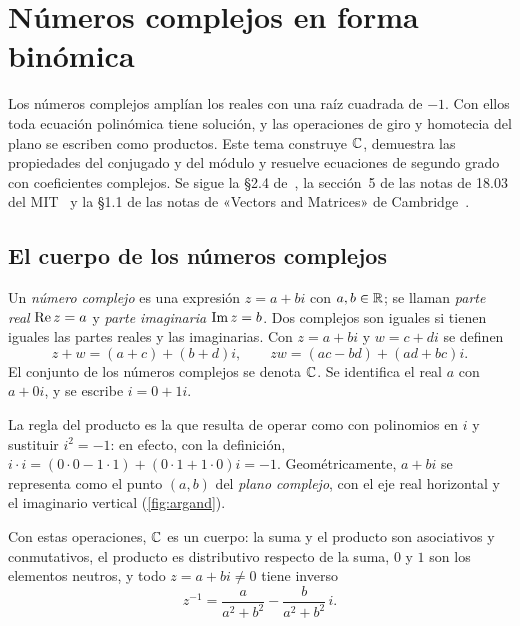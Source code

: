 \chapter{Números complejos en forma binómica}
\label{tema:5}

Los números complejos amplían los reales con una raíz cuadrada de $-1$. Con ellos toda ecuación polinómica tiene solución, y las operaciones de giro y homotecia del plano se escriben como productos. Este tema construye $\mathbb{C}$, demuestra las propiedades del conjugado y del módulo y resuelve ecuaciones de segundo grado con coeficientes complejos. Se sigue la §2.4 de~\cite{osat}, la sección~5 de las notas de 18.03 del MIT~\cite{mit1803} y la §1.1 de las notas de «Vectors and Matrices» de Cambridge~\cite{cambvm}.

\section{El cuerpo de los números complejos}

\begin{definicion}\label{def:complejos}
Un \emph{número complejo} es una expresión $z=a+bi$ con $a,b\in\mathbb{R}$; se llaman \emph{parte real} $\operatorname{Re} z=a$ y \emph{parte imaginaria} $\operatorname{Im} z=b$. Dos complejos son iguales si tienen iguales las partes reales y las imaginarias. Con $z=a+bi$ y $w=c+di$ se definen
\[
z+w=(a+c)+(b+d)i,\qquad zw=(ac-bd)+(ad+bc)i .
\]
El conjunto de los números complejos se denota $\mathbb{C}$. Se identifica el real $a$ con $a+0i$, y se escribe $i=0+1i$.
\end{definicion}

La regla del producto es la que resulta de operar como con polinomios en $i$ y sustituir $i^{2}=-1$: en efecto, con la definición, $i\cdot i=(0\cdot0-1\cdot1)+(0\cdot1+1\cdot0)i=-1$. Geométricamente, $a+bi$ se representa como el punto $(a,b)$ del \emph{plano complejo}, con el eje real horizontal y el imaginario vertical (\cref{fig:argand}).

\begin{teorema}\label{teo:cuerpo}
Con estas operaciones, $\mathbb{C}$ es un cuerpo: la suma y el producto son asociativos y conmutativos, el producto es distributivo respecto de la suma, $0$ y $1$ son los elementos neutros, y todo $z=a+bi\ne0$ tiene inverso
\[
z^{-1}=\frac{a}{a^{2}+b^{2}}-\frac{b}{a^{2}+b^{2}}\,i .
\]
\end{teorema}

